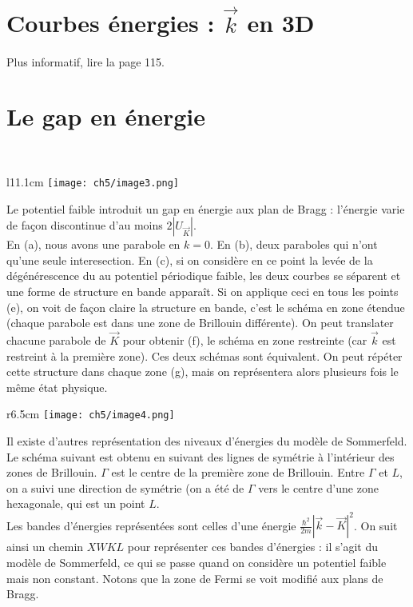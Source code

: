 	\section{Courbes énergies : $\vec{k}$ en 3D}
	Plus informatif, lire la page 115.
	
	\section{Le gap en énergie}\ 
	\begin{wrapfigure}[36]{l}{11.1cm}
	\vspace{-1.4cm}
	\texttt{[image: ch5/image3.png]}
	\end{wrapfigure}
	Le potentiel faible introduit un gap en énergie aux plan de Bragg : l'énergie 
	varie de façon discontinue d'au moins $2|U_{\vec{K}}|$.\\
		
	En (a), nous avons une parabole en $k=0$. En (b), deux paraboles qui n'ont qu'une 
	seule interesection. En (c), si on considère en ce point la levée de la dégénérescence 
	du au potentiel périodique faible, les deux courbes se séparent et une forme de 
	structure en bande apparaît. Si on applique ceci en tous les points (e), on voit de 
	façon claire la structure en bande, c'est le schéma en zone étendue (chaque parabole 
	est dans une zone de Brillouin différente). On peut translater chacune parabole de 
	$\vec{K}$ pour obtenir (f), le schéma en zone restreinte (car $\vec k$ est restreint 
	à la première zone). Ces deux schémas sont équivalent. On peut répéter cette structure 
	dans chaque zone (g), mais on représentera alors plusieurs fois le même état physique. 
	
	
	\newpage
	\begin{wrapfigure}[12]{r}{6.5cm}
	\texttt{[image: ch5/image4.png]}
	\end{wrapfigure}
	
	Il existe d'autres représentation des niveaux d'énergies du modèle de Sommerfeld. Le 
	schéma suivant est obtenu en suivant des lignes de symétrie à l'intérieur des zones 
	de Brillouin. $\Gamma$ est le centre de la première zone de Brillouin. Entre $\Gamma$ 
	et $L$, on a suivi une direction de symétrie (on a été de $\Gamma$ vers le centre d'une 
	zone hexagonale, qui est un point $L$. \\
	Les bandes d'énergies représentées sont celles d'une énergie $\frac{\hbar^2}{2m}|\vec k
	-\vec K|^2$. On suit ainsi un chemin $XWKL$ pour représenter ces bandes d'énergies : 
	il s'agit du modèle de Sommerfeld, ce qui se passe quand on considère un potentiel faible 
	mais non constant.	Notons que la zone de Fermi se voit modifié aux plans de Bragg.
	
